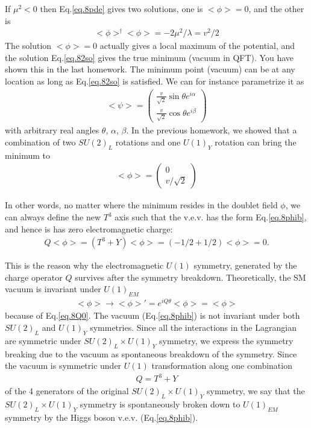 \documentclass[12pt]{article}
\begin{document}
  If $\mu^2 < 0$
  then Eq.\ref{eq.8pde} gives two solutions, one is $<\phi> = 0$, and the other is
  \begin{eqnarray}
    <\phi>^\dagger <\phi> = -2\mu^2/\lambda = v^2/2 \label{eq.82so}
  \end{eqnarray}
  The solution $<\phi> = 0$ actually gives a local maximum of the potential,
  and the solution Eq.\ref{eq.82so} gives the true minimum (vacuum in QFT).
  You have shown this in the last homework. The minimum point
  (vacuum) can be at any location as long as Eq.\ref{eq.82so} is satisfied.
  We can for instance parametrize it as
  \begin{eqnarray}
    <\psi>=
    \begin{pmatrix}
      \frac{v}{\sqrt2} \sin\theta e^{i\alpha} \\
      \frac{v}{\sqrt2} \cos\theta e^{i\beta}
    \end{pmatrix}
  \end{eqnarray}
  with arbitrary real angles $\theta$, $\alpha$, $\beta$.  In the previous
  homework, we showed that a combination of two $SU(2)_L$ rotations
  and one $U(1)_Y$ rotation can bring the minimum to
  \begin{eqnarray}
    <\phi> = 
    \begin{pmatrix}
      0 \\ v/\sqrt2
    \end{pmatrix} \label{eq.8phib}
  \end{eqnarray}

  In other words, no matter where the minimum resides in the doublet
  field $\phi$, we can always define the new $T^3$ axis such that the
  v.e.v. has the form Eq.\ref{eq.8phib}, and hence is has zero electromagnetic charge:
  \begin{eqnarray}
    Q <\phi> = (T^3 + Y) <\phi> = (-1/2 + 1/2) <\phi> = 0. \label{eq.8Q0}
  \end{eqnarray}

  This is the reason why the electromagnetic $U(1)$ symmetry, generated
  by the charge operator $Q$ survives after the symmetry breakdown.
  Theoretically, the SM vacuum is invariant under $U(1)_{EM}$
 \begin{eqnarray}
  <\phi> \to <\phi>' = e^{iQ\theta} <\phi> = <\phi>
 \end{eqnarray}
  because of Eq.\ref{eq.8Q0}. The vacuum (Eq.\ref{eq.8phib}) is not invariant under both $SU(2)_L$ and $U(1)_Y$ symmetries. Since all the interactions in
  the Lagrangian are symmetric under $SU(2)_L \times U(1)_Y$ symmetry,
  we express the symmetry breaking due to the vacuum as spontaneous
  breakdown of the symmetry.  Since the vacuum is symmetric under
  $U(1)$ transformation along one combination
 \begin{eqnarray}
  Q = T^3 + Y
 \end{eqnarray}
  of the 4 generators of the original $SU(2)_L \times U(1)_Y$ symmetry,
  we say that the $SU(2)_L \times U(1)_Y$ symmetry is spontaneously
  broken down to $U(1)_{EM}$ symmetry by the Higgs boson v.e.v. (Eq.\ref{eq.8phib}).
\end{document}
